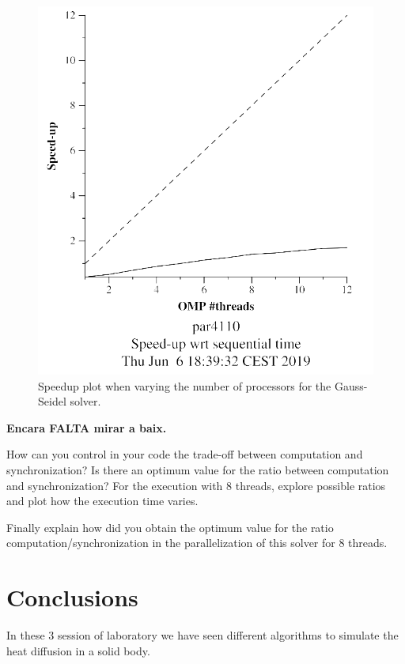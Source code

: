 \documentclass[12pt, a4paper]{article}
\begin{document}
\begin{figure}[H]
\begin{minipage}{0.4\linewidth}
  \includegraphics[scale=0.5]{./images/heat-omp-strong-gauss-speedup}
  \caption{Speedup plot when varying the number of processors for the Gauss-Seidel solver.}
    \label{plot:speed-gauss}
\end{minipage}
\end{figure}

\textbf{\large{\large{Encara FALTA mirar a baix.}}}

How can you control in your code the trade-off between computation and synchronization? Is there
an optimum value for the ratio between computation and synchronization? For the execution with
8 threads, explore possible ratios and plot how the execution time varies.

Finally explain
how did you obtain the optimum value for the ratio computation/synchronization in the parallelization
of this solver for 8 threads.

\newpage

\section{Conclusions}

In these 3 session of laboratory we have seen different algorithms to simulate the heat diffusion in a solid body.
\end{document}
